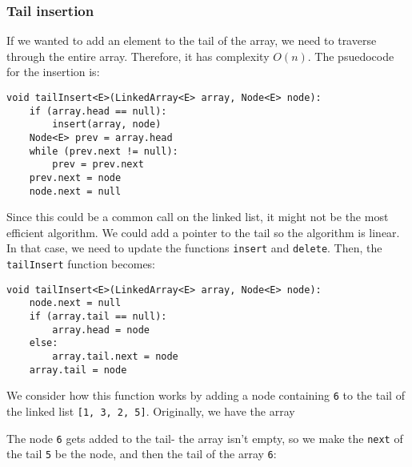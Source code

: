 \documentclass[a4paper, openany]{memoir}
\begin{document}
\subsubsection{Tail insertion}
If we wanted to add an element to the tail of the array, we need to traverse through the entire array. Therefore, it has complexity $O(n)$. The psuedocode for the insertion is:
\begin{lstlisting}[language=pseudocode]
void tailInsert<E>(LinkedArray<E> array, Node<E> node):
    if (array.head == null):
        insert(array, node)
    Node<E> prev = array.head
    while (prev.next != null):
        prev = prev.next
    prev.next = node
    node.next = null
\end{lstlisting}
Since this could be a common call on the linked list, it might not be the most efficient algorithm. We could add a pointer to the tail so the algorithm is linear. In that case, we need to update the functions \texttt{insert} and \texttt{delete}. Then, the \texttt{tailInsert} function becomes:
\begin{lstlisting}[language=pseudocode]
void tailInsert<E>(LinkedArray<E> array, Node<E> node):
    node.next = null
    if (array.tail == null):
        array.head = node
    else:
        array.tail.next = node
    array.tail = node
\end{lstlisting}
We consider how this function works by adding a node containing \texttt{6} to the tail of the linked list \texttt{[1, 3, 2, 5]}. Originally, we have the array
\begin{center}
\end{center}
The node \texttt{6} gets added to the tail- the array isn't empty, so we make the \texttt{next} of the tail \texttt{5} be the node, and then the tail of the array \texttt{6}:
\begin{center}
\end{center}
\end{document}
